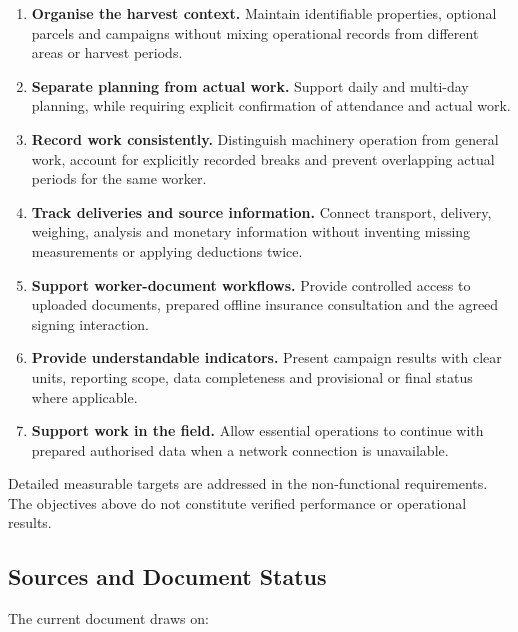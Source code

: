 \begin{enumerate}

    \item \textbf{Organise the harvest context.}
    Maintain identifiable properties, optional parcels
    and campaigns without mixing operational records
    from different areas or harvest periods.

    \item \textbf{Separate planning from actual work.}
    Support daily and multi-day planning,
    while requiring explicit confirmation
    of attendance and actual work.

    \item \textbf{Record work consistently.}
    Distinguish machinery operation from general work,
    account for explicitly recorded breaks
    and prevent overlapping actual periods
    for the same worker.

    \item \textbf{Track deliveries and source information.}
    Connect transport, delivery, weighing,
    analysis and monetary information
    without inventing missing measurements
    or applying deductions twice.

    \item \textbf{Support worker-document workflows.}
    Provide controlled access to uploaded documents,
    prepared offline insurance consultation
    and the agreed signing interaction.

    \item \textbf{Provide understandable indicators.}
    Present campaign results with clear units,
    reporting scope, data completeness
    and provisional or final status where applicable.

    \item \textbf{Support work in the field.}
    Allow essential operations to continue
    with prepared authorised data
    when a network connection is unavailable.


\end{enumerate}

Detailed measurable targets are addressed
in the non-functional requirements.
The objectives above do not constitute
verified performance or operational results.

\subsection{Sources and Document Status}\label{sec:document-status}

The current document draws on:

